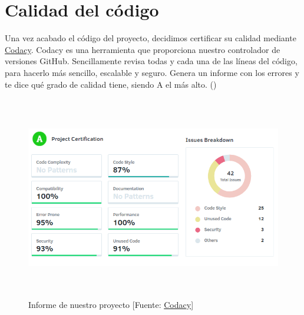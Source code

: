 \section{Calidad del código}
\label{makereference7.4}

Una vez acabado el código del proyecto, decidimos certificar su calidad mediante \href{https://www.codacy.com}{Codacy}.
Codacy es una herramienta que proporciona nuestro controlador de versiones GitHub. Sencillamente revisa todas y cada una de las líneas del código, para hacerlo más sencillo, escalable y seguro. Genera un informe con los errores y te dice qué grado de calidad tiene, siendo A el más alto. (\cite{ARP:Codacy:2017})

\begin{figure}[htb]
	\begin{center}
		\includegraphics[height=3.5in]{figures/codacy.png}
		\caption{Informe de nuestro proyecto [Fuente: \href{https://www.codacy.com}{Codacy}] \label{codacy}}
	\end{center}
\end{figure}